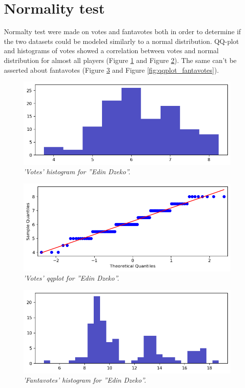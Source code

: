\section{Normality test}

Normalty test were made on votes and fantavotes both in order to determine if the two datasets could be modeled similarly to a normal distribution.
QQ-plot and histograms of votes showed a correlation between votes and normal distribution for almost all players (Figure \ref{fig:hist_votes} and Figure \ref{fig:qqplot_votes}).
The same can't be asserted about fantavotes (Figure \ref{fig:hist_fantavotes} and Figure \ref{fig:qqplot_fantavotes}).

\begin{figure}[H]
  \includegraphics[scale=0.5]{images/dzeko_normality_test_voti_barchart.png}
   \caption{\textit{'Votes' histogram for ''Edin Dzeko''.}}
  \label{fig:hist_votes}
\end{figure}

\begin{figure}[H]
  \includegraphics[scale=0.5]{images/dzeko_normality_test_voti_qqplot.png}
   \caption{\textit{'Votes' qqplot for ''Edin Dzeko''.}}
  \label{fig:qqplot_votes}
\end{figure}

\begin{figure}[H]
  \includegraphics[scale=0.5]{images/dzeko_normality_test_fantavoti_barchart.png}
   \caption{\textit{'Fantavotes' histogram for ''Edin Dzeko''.}}
  \label{fig:hist_fantavotes}
\end{figure}

